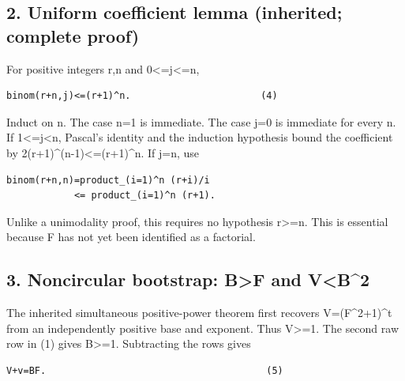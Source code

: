 \subsection*{2. Uniform coefficient lemma (inherited; complete proof)}



For positive integers r,n and 0\textless{}\allowbreak{}=\allowbreak{}j\textless{}\allowbreak{}=\allowbreak{}n,



\begin{verbatim}
binom(r+n,j)<=(r+1)^n.                       (4)
\end{verbatim}

Induct on n. The case n=\allowbreak{}1 is immediate. The case j=\allowbreak{}0 is immediate for every n. If 1\textless{}\allowbreak{}=\allowbreak{}j\textless{}\allowbreak{}n, Pascal's identity and the induction hypothesis bound the coefficient by 2(r+\allowbreak{}1)\textasciicircum{}\allowbreak{}(n-1)\textless{}\allowbreak{}=\allowbreak{}(r+\allowbreak{}1)\textasciicircum{}\allowbreak{}n. If j=\allowbreak{}n, use



\begin{verbatim}
binom(r+n,n)=product_(i=1)^n (r+i)/i
            <= product_(i=1)^n (r+1).
\end{verbatim}

Unlike a unimodality proof, this requires no hypothesis r\textgreater{}\allowbreak{}=\allowbreak{}n. This is essential because F has not yet been identified as a factorial.



\subsection*{3. Noncircular bootstrap: B\textgreater{}\allowbreak{}F and V\textless{}\allowbreak{}B\textasciicircum{}\allowbreak{}2}



The inherited simultaneous positive-power theorem first recovers V=\allowbreak{}(F\textasciicircum{}\allowbreak{}2+\allowbreak{}1)\textasciicircum{}\allowbreak{}t from an independently positive base and exponent. Thus V\textgreater{}\allowbreak{}=\allowbreak{}1. The second raw row in (1) gives B\textgreater{}\allowbreak{}=\allowbreak{}1. Subtracting the rows gives



\begin{verbatim}
V+v=BF.                                       (5)
\end{verbatim}

